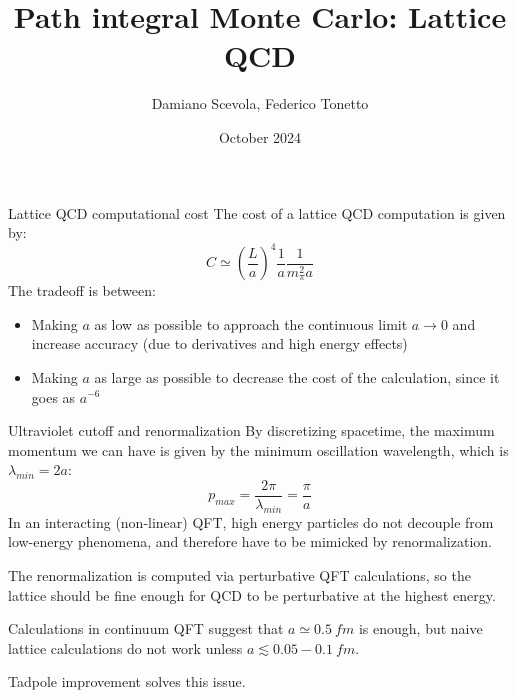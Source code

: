\documentclass{beamer}
\title{Path integral Monte Carlo: Lattice QCD}
\author{Damiano Scevola, Federico Tonetto}
\institute{University of Bologna}
\date{October 2024}
\begin{document}
\frame{\titlepage}
\begin{frame}{Lattice QCD computational cost}
    The cost of a lattice QCD computation is given by:
    \begin{equation*}
        C \simeq \left(\frac{L}{a}\right)^4 \frac{1}{a}\frac{1}{m_{\pi}^2 a}
    \end{equation*}
    The tradeoff is between:
    \begin{itemize}
        \item Making $a$ as low as possible to approach the continuous limit $a \rightarrow 0$ and increase accuracy (due to derivatives and high energy effects)
        \item Making $a$ as large as possible to decrease the cost of the calculation, since it goes as $a^{-6}$
    \end{itemize}
\end{frame}

\begin{frame}{Ultraviolet cutoff and renormalization}
    By discretizing spacetime, the maximum momentum we can have is given by the minimum oscillation wavelength, which is $\lambda_{min}=2a$:
    \begin{equation*}
        p_{max} = \frac{2\pi}{\lambda_{min}} = \frac{\pi}{a}
    \end{equation*}
    In an interacting (non-linear) QFT, high energy particles do not decouple from low-energy phenomena, and therefore have to be mimicked by renormalization.

    The renormalization is computed via perturbative QFT calculations, so the lattice should be fine enough for QCD to be perturbative at the highest energy.

    Calculations in continuum QFT suggest that $a\simeq 0.5\ fm$ is enough, but naive lattice calculations do not work unless $a \lesssim 0.05-0.1\ fm$.

    Tadpole improvement solves this issue.
\end{frame}
\end{document}
